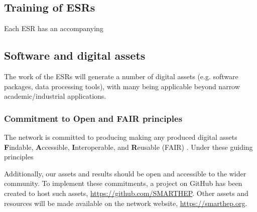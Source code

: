 \subsection{Training of ESRs}
\label{training}
Each ESR has an accompanying 

\subsection{Software and digital assets}
\label{software}
The work of the ESRs will generate a number of digital assets (e.g. software packages, data processing tools), with many being applicable beyond narrow academic/industrial applications. 

\subsubsection{Commitment to Open and FAIR principles}
\label{open-FAIR}
The network is committed to producing making any produced digital assets \textbf{F}indable, \textbf{A}ccessible, \textbf{I}nteroperable, and \textbf{R}eusable (FAIR) \cite{FAIR-principles}. Under these guiding principles\par
Additionally, our assets and results should be open and accessible to the wider community. To implement these commitments, a project on GitHub has been created to host such assets, \url{https://github.com/SMARTHEP}. Other assets and resources will be made available on the network website, \url{https://smarthep.org}.